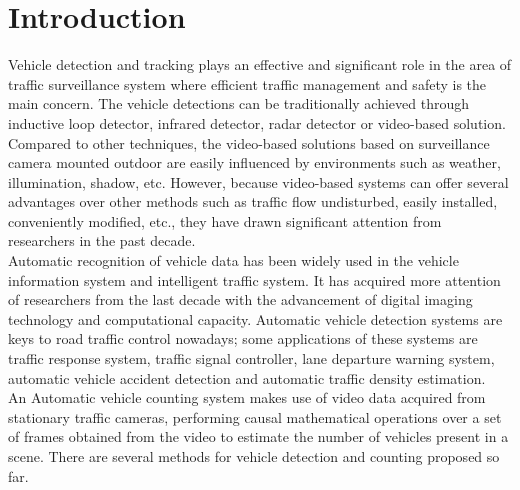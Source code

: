 

\chapter{Introduction}
	
   \par Vehicle detection and tracking plays an effective and significant role in the area of traffic surveillance system where efficient traffic management and safety is the main concern. The vehicle detections can be traditionally achieved through inductive loop detector, infrared detector, radar detector or video-based solution. Compared to other techniques, the video-based solutions based on surveillance camera mounted outdoor are easily influenced by environments such as weather, illumination, shadow, etc. However, because video-based systems can offer several advantages over other methods such as traffic flow undisturbed, easily installed, conveniently modified, etc., they have drawn significant attention from researchers in the past decade.\\

Automatic recognition of vehicle data has been widely used in the vehicle information system and intelligent traffic system. It has acquired more attention of researchers from the last decade with the advancement of digital imaging technology and computational capacity.  Automatic vehicle detection systems are keys to road traffic control nowadays; some applications of these systems are traffic response system, traffic signal controller, lane departure warning system, automatic vehicle accident detection and automatic traffic density estimation.\\

An Automatic vehicle counting system makes use of video data acquired from stationary traffic cameras, performing causal mathematical operations over a set of frames obtained from the video to estimate the number of vehicles present in a scene. There are several methods for vehicle detection and counting proposed so far.\\
\newpage 


